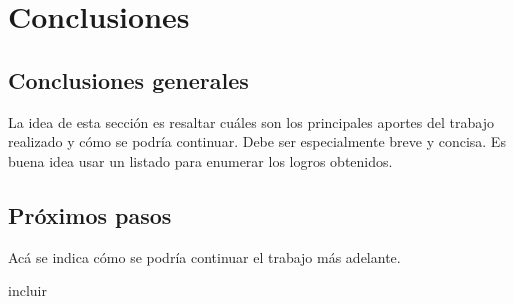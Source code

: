 
\chapter{Conclusiones} %

\label{Chapter5} %




\section{Conclusiones generales }

La idea de esta sección es resaltar cuáles son los principales aportes del trabajo realizado y cómo se podría continuar. Debe ser especialmente breve y concisa. Es buena idea usar un listado para enumerar los logros obtenidos.

\section{Próximos pasos}

Acá se indica cómo se podría continuar el trabajo más adelante.

incluir %